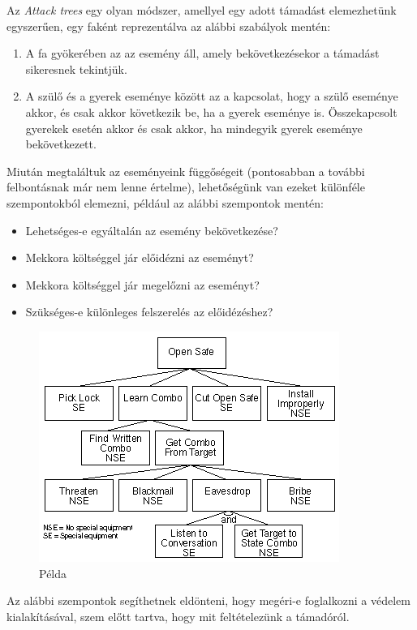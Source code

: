 Az \emph{Attack trees}\cite{schneier1999attack} egy olyan módszer, amellyel egy adott támadást
elemezhetünk egyszerűen, egy faként reprezentálva az alábbi szabályok mentén:
\begin{enumerate}
    \item A fa gyökerében az az esemény áll, amely bekövetkezésekor a támadást sikeresnek tekintjük.
    \item A szülő és a gyerek eseménye között az a kapcsolat, hogy a szülő eseménye akkor, és csak
        akkor következik be, ha a gyerek eseménye is.  Összekapcsolt gyerekek esetén akkor és csak
        akkor, ha mindegyik gyerek eseménye bekövetkezett.
\end{enumerate}
Miután megtaláltuk az eseményeink függőségeit (pontosabban a további felbontásnak már nem lenne
értelme), lehetőségünk van ezeket különféle szempontokból elemezni, például az alábbi szempontok
mentén:
\begin{itemize}
    \item Lehetséges-e egyáltalán az esemény bekövetkezése?
    \item Mekkora költséggel jár előidézni az eseményt?
    \item Mekkora költséggel jár megelőzni az eseményt?
    \item Szükséges-e különleges felszerelés az előidézéshez?
\end{itemize}

\begin{figure}[h]
    \includegraphics[height=0.4\textheight]{figures/attacktrees.png}
    \centering
    \caption{Példa }
\end{figure}

Az alábbi szempontok segíthetnek eldönteni, hogy megéri-e foglalkozni a védelem kialakításával,
szem előtt tartva, hogy mit feltételezünk a támadóról.

